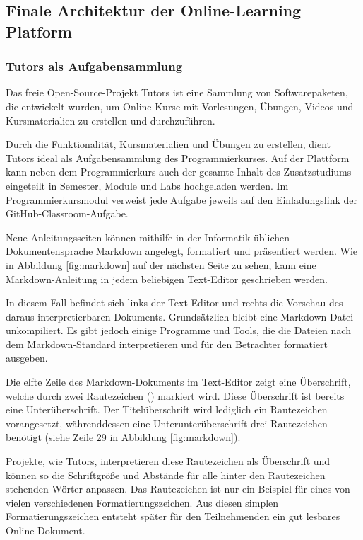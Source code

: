 \subsection{Finale Architektur der Online-Learning Platform}
\subsubsection{Tutors als Aufgabensammlung}\label{finale-architektur-tutors}
Das freie Open-Source-Projekt Tutors ist eine Sammlung von Softwarepaketen,
die entwickelt wurden, um Online-Kurse mit Vorlesungen, Übungen, Videos und
Kursmaterialien zu erstellen und durchzuführen. \parencite{tutors}

Durch die Funktionalität, Kursmaterialien und Übungen zu erstellen, dient Tutors
ideal als Aufgabensammlung des Programmierkurses. Auf der Plattform kann neben
dem Programmierkurs auch der gesamte Inhalt des Zusatzstudiums eingeteilt in
Semester, Module und Labs hochgeladen werden. Im Programmierkursmodul verweist
jede Aufgabe jeweils auf den Einladungslink der GitHub-Classroom-Aufgabe.

Neue Anleitungsseiten können mithilfe in der Informatik üblichen
Dokumentensprache Markdown angelegt, formatiert und präsentiert werden. Wie in
Abbildung \ref{fig:markdown} auf der nächsten Seite zu sehen, kann eine 
Markdown-Anleitung in jedem beliebigen Text-Editor geschrieben werden.

In diesem Fall befindet sich links der Text-Editor und rechts die Vorschau des
daraus interpretierbaren Dokuments. Grundsätzlich bleibt eine Markdown-Datei
unkompiliert. Es gibt jedoch einige Programme und Tools, die die Dateien
nach dem Markdown-Standard interpretieren und für den Betrachter formatiert
ausgeben.

Die elfte Zeile des Markdown-Dokuments im Text-Editor zeigt eine Überschrift,
welche durch zwei Rautezeichen (\code{\#\#}) markiert wird. Diese Überschrift
ist bereits eine Unterüberschrift. Der Titelüberschrift wird lediglich ein
Rautezeichen vorangesetzt, währenddessen eine Unterunterüberschrift drei
Rautezeichen benötigt (siehe Zeile 29 in Abbildung \ref{fig:markdown}).

Projekte, wie Tutors, interpretieren diese Rautezeichen als Überschrift und
können so die Schriftgröße und Abstände für alle hinter den Rautezeichen
stehenden Wörter anpassen. Das Rautezeichen ist nur ein Beispiel für eines von
vielen verschiedenen Formatierungszeichen. Aus diesen simplen
Formatierungszeichen entsteht später für den Teilnehmenden ein gut lesbares
Online-Dokument. \parencite{markdown}

